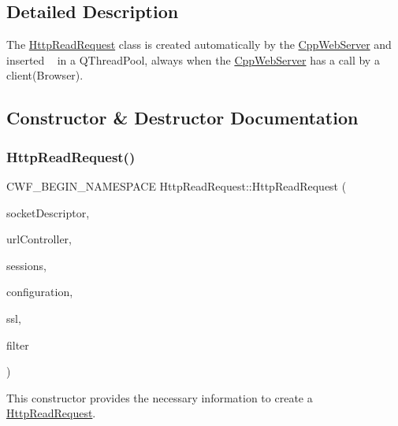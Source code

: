 \subsection{Detailed Description}
The \hyperlink{class_http_read_request}{Http\+Read\+Request} class is created automatically by the \hyperlink{class_cpp_web_server}{Cpp\+Web\+Server} and inserted ~\newline
 in a Q\+Thread\+Pool, always when the \hyperlink{class_cpp_web_server}{Cpp\+Web\+Server} has a call by a client(\+Browser). 

\subsection{Constructor \& Destructor Documentation}
\mbox{\label{class_http_read_request_a1b3515d60b21be64bbb3afb7b5b03dcd}} 
\subsubsection{\texorpdfstring{Http\+Read\+Request()}{HttpReadRequest()}}
{\footnotesize\ttfamily C\+W\+F\+\_\+\+B\+E\+G\+I\+N\+\_\+\+N\+A\+M\+E\+S\+P\+A\+CE Http\+Read\+Request\+::\+Http\+Read\+Request (\begin{DoxyParamCaption}\item[{qintptr}]{socket\+Descriptor,  }\item[{\hyperlink{class_q_map_thread_safety}{Q\+Map\+Thread\+Safety}$<$ Q\+String, \hyperlink{class_controller}{Controller} $\ast$$>$ \&}]{url\+Controller,  }\item[{\hyperlink{class_q_map_thread_safety}{Q\+Map\+Thread\+Safety}$<$ Q\+String, \hyperlink{class_session}{Session} $\ast$$>$ \&}]{sessions,  }\item[{const \hyperlink{class_configuration}{Configuration} \&}]{configuration,  }\item[{Q\+Ssl\+Configuration $\ast$}]{ssl,  }\item[{\hyperlink{class_filter}{Filter} $\ast$}]{filter }\end{DoxyParamCaption})}



This constructor provides the necessary information to create a \hyperlink{class_http_read_request}{Http\+Read\+Request}. 


